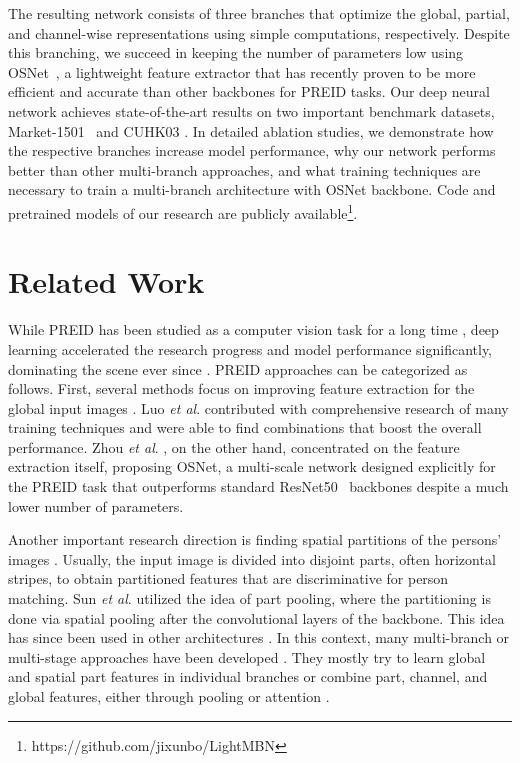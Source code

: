 \documentclass{article}
\newcommand{\etal}{\textit{et al}. }
\begin{document}
 The resulting network consists of three branches that optimize the global, partial, and channel-wise representations using simple computations, respectively. Despite this branching, we succeed in keeping the number of parameters low using OSNet~\cite{zhou2019omni}, a lightweight feature extractor that has recently proven to be more efficient and accurate than other backbones for \ac{PREID} tasks. Our deep neural network achieves state-of-the-art results on two important benchmark datasets, Market-1501~\cite{zheng2015scalable} and CUHK03 \cite{li2014deepreid}. In detailed ablation studies, we demonstrate how the respective branches increase model performance, why our network performs better than other multi-branch approaches, and what training techniques are necessary to train a multi-branch architecture with OSNet backbone. Code and pretrained models of our research are publicly available\footnote{https://github.com/jixunbo/LightMBN}.

\section{Related Work}
\label{sec:rw}
While \ac{PREID} has been studied as a computer vision task for a long time \cite{gheissari2006person}, deep learning accelerated the research progress and model performance significantly, dominating the scene ever since \cite{zheng2016person, ye2020deep, luo2019bag, zhou2019omni, sun2018beyond, wang2018learning}. \ac{PREID} approaches can be categorized as follows.
First, several methods focus on improving feature extraction for the global input images \cite{luo2019bag, zhou2019omni, dai2019batch}. Luo \etal \cite{luo2019bag} contributed with comprehensive research of many training techniques and were able to find combinations that boost the overall performance. Zhou \etal \cite{zhou2019omni}, on the other hand, concentrated on the feature extraction itself, proposing OSNet, a multi-scale network designed explicitly for the \ac{PREID} task that outperforms standard ResNet50~\cite{he2016deep} backbones despite a much lower number of parameters.

Another important research direction is finding spatial partitions of the persons' images \cite{sun2018beyond, zheng2019pyramidal, chen2020learning}. Usually, the input image is divided into disjoint parts, often horizontal stripes, to obtain partitioned features that are discriminative for person matching. Sun \etal \cite{sun2018beyond} utilized the idea of part pooling, where the partitioning is done via spatial pooling after the convolutional layers of the backbone. This idea has since been used in other architectures \cite{wang2018learning, chen2020learning, zheng2019pyramidal}. In this context, many multi-branch or multi-stage approaches have been developed \cite{wang2018learning, chen2020learning, xie2020learning}. They mostly try to learn global and spatial part features in individual branches or combine part, channel, and global features, either through pooling \cite{wang2018learning, chen2020learning, zheng2019pyramidal} or attention \cite{chen2019mixed, chen2019abd, chen2020salience, lawen2020compact}.
\end{document}
